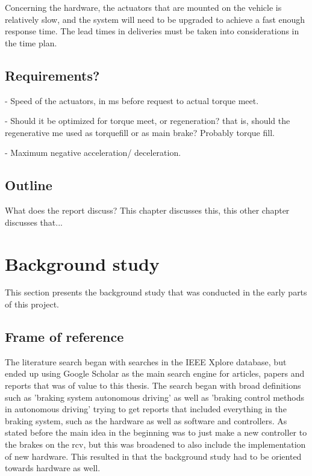 \documentclass[a4paper,11pt]{kth-mag}
\begin{document}
Concerning the hardware, the actuators that are mounted on the vehicle is relatively slow, and the system will need to be upgraded to achieve a fast enough response time. The lead times in deliveries must be taken into considerations in the time plan.

\section{Requirements?}

- Speed of the actuators, in ms before request to actual torque meet.

- Should it be optimized for torque meet, or regeneration? that is, should the regenerative me used as torquefill or as main brake? Probably torque fill.

- Maximum negative acceleration/ deceleration.

\section{Outline}
What does the report discuss?
This chapter discusses this, this other chapter discusses that...



\chapter{Background study}
This section presents the background study that was conducted in the early parts of this project. 


\section{Frame of reference}
The literature search began with searches in the IEEE Xplore database, but ended up using Google Scholar as the main search engine for articles, papers and reports that was of value to this thesis. The search began with broad definitions such as 'braking system autonomous driving' as well as 'braking control methods in autonomous driving' trying to get reports that included everything in the braking system, such as the hardware as well as software and controllers. As stated before the main idea in the beginning was to just make a new controller to the brakes on the \gls{rcv}, but this was broadened to also include the implementation of new hardware. This resulted in that the background study had to be oriented towards hardware as well. 
\end{document}
